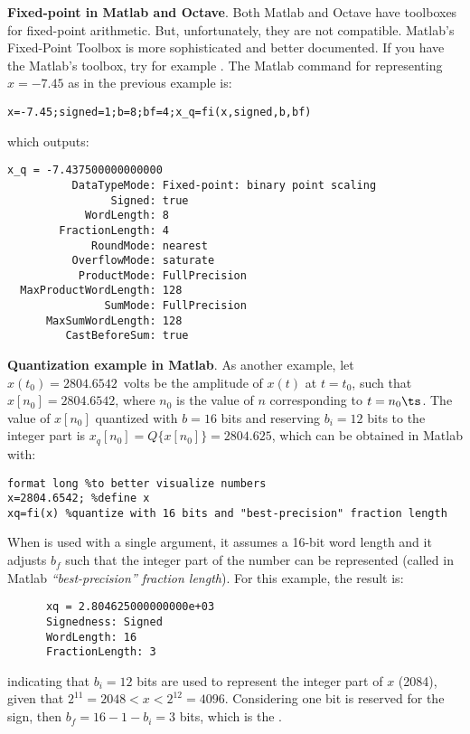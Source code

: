 \bExample \textbf{Fixed-point in Matlab and Octave}.
Both Matlab and Octave have toolboxes for fixed-point arithmetic. But, unfortunately, they are not compatible. Matlab's Fixed-Point Toolbox is more sophisticated and better documented. If you have the Matlab's toolbox, try for example .  
The Matlab command for representing $x=-7.45$ as in the previous example is:
\begin{lstlisting}
x=-7.45;signed=1;b=8;bf=4;x_q=fi(x,signed,b,bf)
\end{lstlisting}
which outputs:
\begin{verbatim}
x_q = -7.437500000000000
          DataTypeMode: Fixed-point: binary point scaling
                Signed: true
            WordLength: 8
        FractionLength: 4
             RoundMode: nearest
          OverflowMode: saturate
           ProductMode: FullPrecision
  MaxProductWordLength: 128
               SumMode: FullPrecision
      MaxSumWordLength: 128
         CastBeforeSum: true
\end{verbatim}

\bExample \textbf{Quantization example in Matlab}.
\label{ex:quantization}
As another example, let $x(t_0)=2804.6542$~volts be the amplitude of $x(t)$ at $t=t_0$, such that $x[n_0]=2804.6542$, where $n_0$ is the value of $n$ corresponding to $t=n_0 \ts$. The value of $x[n_0]$ quantized with $b=16$ bits and reserving $b_i=12$ bits to the integer part is $x_q[n_0]=Q\{x[n_0]\}=2804.625$, which can be obtained in Matlab with:
\begin{lstlisting}
format long %to better visualize numbers
x=2804.6542; %define x
xq=fi(x) %quantize with 16 bits and "best-precision" fraction length
\end{lstlisting}
When  is used with a single argument, it assumes a 16-bit word length and it adjusts $b_f$ 
such that the integer part of the number can be represented (called in Matlab \emph{``best-precision'' fraction length}).
For this example, the result is:
\begin{verbatim}
      xq = 2.804625000000000e+03
      Signedness: Signed
      WordLength: 16
      FractionLength: 3
\end{verbatim}
indicating that $b_i=12$ bits are used to represent the integer part of $x$ (2084), given that $2^{11}=2048 < x < 2^{12}=4096$. Considering one bit is reserved for the sign, then $b_f = 16 - 1 - b_i = 3$ bits, which is the .
\eExample

